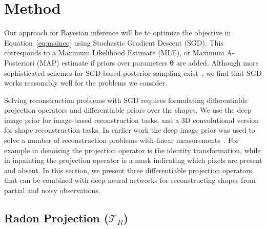 \section{Method}
\label{dsp:method}
Our approach for Bayesian inference will be to optimize the objective in Equation~\ref{eq:maineq} using Stochastic Gradient Descent (SGD). 
This corresponds to a Maximum Likelihood Estimate (MLE), or Maximum A-Posteriori (MAP) estimate if priors over parameters $\bm{\theta}$ are added.
Although more sophisticated schemes for SGD based posterior sampling exist~\cite{sgld, bayesiandip}, we find that SGD works reasonably well for the problems we consider.


Solving reconstruction problems with SGD requires formulating differentiable projection operators and differentiable priors over the shapes.
We use the deep image prior for image-based reconstruction tasks, and a 3D convolutional version for shape reconstruction tasks.
In earlier work the deep image prior was used to solve a number of reconstruction problems with linear measurements~\cite{ulyanov17deep}. 
For example in denoising the projection operator is the identity transformation, while in inpainting the projection operator is a mask indicating which pixels are present and absent. 
In this section, we present three differentiable projection operators that can be combined with deep neural networks for reconstructing shapes from partial and noisy observations.


\subsection{Radon Projection ($\mathcal{T}_R$)}

